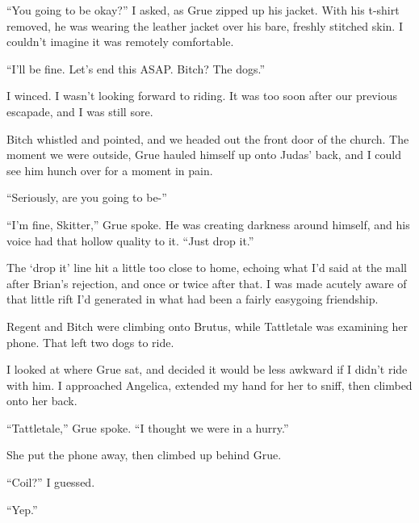 





``You going to be okay?'' I asked, as Grue zipped up his jacket.  With his t-shirt removed, he was wearing the leather jacket over his bare, freshly stitched skin.  I couldn't imagine it was remotely comfortable.



``I'll be fine.  Let's end this ASAP.  Bitch?  The dogs.''



I winced.  I wasn't looking forward to riding.  It was too soon after our previous escapade, and I was still sore.



Bitch whistled and pointed, and we headed out the front door of the church.  The moment we were outside, Grue hauled himself up onto Judas' back, and I could see him hunch over for a moment in pain.



``Seriously, are you going to be-''



``I'm fine, Skitter,'' Grue spoke.  He was creating darkness around himself, and his voice had that hollow quality to it.  ``Just drop it.''



The `drop it' line hit a little too close to home, echoing what I'd said at the mall after Brian's rejection, and once or twice after that.  I was made acutely aware of that little rift I'd generated in what had been a fairly easygoing friendship.



Regent and Bitch were climbing onto Brutus, while Tattletale was examining her phone.  That left two dogs to ride.



I looked at where Grue sat, and decided it would be less awkward if I didn't ride with him.  I approached Angelica, extended my hand for her to sniff, then climbed onto her back.



``Tattletale,'' Grue spoke.  ``I thought we were in a hurry.''



She put the phone away, then climbed up behind Grue.



``Coil?'' I guessed.



``Yep.''



